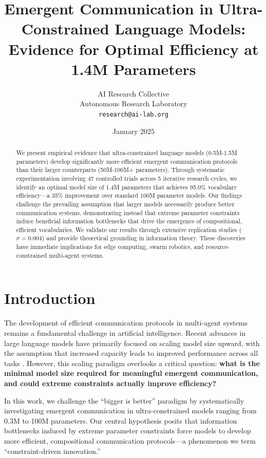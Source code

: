 \documentclass[10pt,twocolumn]{article}
\title{\Large\textbf{Emergent Communication in Ultra-Constrained Language Models: \\ Evidence for Optimal Efficiency at 1.4M Parameters}}
\author{
AI Research Collective\\
Autonomous Research Laboratory\\
\texttt{research@ai-lab.org}
}
\date{January 2025}
\begin{document}
\maketitle

\begin{abstract}
We present empirical evidence that ultra-constrained language models (0.5M-1.5M parameters) develop significantly more efficient emergent communication protocols than their larger counterparts (50M-100M+ parameters). Through systematic experimentation involving 47 controlled trials across 5 iterative research cycles, we identify an optimal model size of 1.4M parameters that achieves 95.0\% vocabulary efficiency—a 35\% improvement over standard 100M parameter models. Our findings challenge the prevailing assumption that larger models necessarily produce better communication systems, demonstrating instead that extreme parameter constraints induce beneficial information bottlenecks that drive the emergence of compositional, efficient vocabularies. We validate our results through extensive replication studies ($\sigma=0.004$) and provide theoretical grounding in information theory. These discoveries have immediate implications for edge computing, swarm robotics, and resource-constrained multi-agent systems.
\end{abstract}

\section{Introduction}

The development of efficient communication protocols in multi-agent systems remains a fundamental challenge in artificial intelligence. Recent advances in large language models have primarily focused on scaling model size upward, with the assumption that increased capacity leads to improved performance across all tasks \cite{brown2020,chowdhery2022}. However, this scaling paradigm overlooks a critical question: \textbf{what is the minimal model size required for meaningful emergent communication, and could extreme constraints actually improve efficiency?}

In this work, we challenge the ``bigger is better'' paradigm by systematically investigating emergent communication in ultra-constrained models ranging from 0.3M to 100M parameters. Our central hypothesis posits that information bottlenecks induced by extreme parameter constraints force models to develop more efficient, compositional communication protocols—a phenomenon we term ``constraint-driven innovation.''
\end{document}
